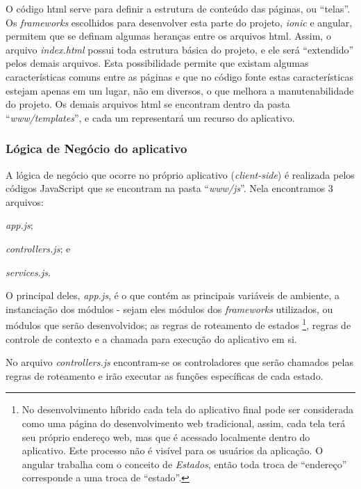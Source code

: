 O código \gls{html} serve para definir a estrutura de conteúdo das páginas, ou ``telas''. Os \textit{frameworks} escolhidos para desenvolver esta parte do projeto, \textit{ionic} e \gls{angular}, permitem que se definam algumas heranças entre os arquivos \gls{html}. Assim, o arquivo \textit{index.html} possui toda estrutura básica do projeto, e ele será ``extendido'' pelos demais arquivos. Esta possibilidade permite que existam algumas características comuns entre as páginas e que no código fonte estas características estejam apenas em um lugar, não em diversos, o que melhora a manutenabilidade do projeto. Os demais arquivos \gls{html} se encontram dentro da pasta ``\textit{www/templates}'', e cada um representará um recurso do aplicativo.

\subsubsection{Lógica de Negócio do aplicativo}
A lógica de negócio que ocorre no próprio aplicativo (\textit{client-side}) é realizada pelos códigos JavaScript que se encontram na pasta ``\textit{www/js}''. Nela encontramos 3 arquivos:
\begin{enumerate*}[label=\itshape\alph*\upshape)]
    \item \textit{app.js};
    \item \textit{controllers.js}; e
    \item \textit{services.js}.
\end{enumerate*}

O principal deles, \textit{app.js}, é o que contém as principais variáveis de ambiente, a instanciação dos módulos - sejam eles módulos dos \textit{frameworks} utilizados, ou módulos que serão desenvolvidos; as regras de roteamento de estados%
\footnote{No desenvolvimento híbrido cada tela do aplicativo final pode ser considerada como uma página do desenvolvimento web tradicional, assim, cada tela terá seu próprio endereço web, mas que é acessado localmente dentro do aplicativo. Este processo não é visível para os usuários da aplicação. O \gls{angular} trabalha com o conceito de \textit{Estados}, então toda troca de ``endereço'' corresponde a uma troca de ``estado''.},
regras de controle de contexto e a chamada para execução do aplicativo em si.

No arquivo \textit{controllers.js} encontram-se os controladores que serão chamados pelas regras de roteamento e irão executar as funções específicas de cada estado.

